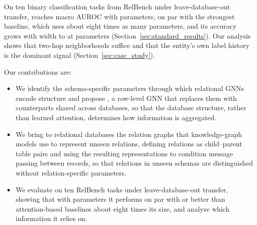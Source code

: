 On ten binary classification tasks from RelBench under leave-database-out
transfer, \model{} reaches \mainAUROC{} macro AUROC with \mainParams{}
parameters, on par with the strongest baseline, which uses about eight times as
many parameters, and its accuracy grows with width to \wideAUROC{} at
\wideParams{} parameters (Section~\ref{sec:standard_results}). Our analysis
shows that two-hop neighborhoods suffice and that the entity's own label
history is the dominant signal (Section~\ref{sec:case_study}).

Our contributions are:
\begin{itemize}
  \item We identify the schema-specific parameters through which relational
  GNNs encode structure and propose \model{}, a row-level GNN that replaces
  them with counterparts shared across databases, so that the database
  structure, rather than learned attention, determines how information is
  aggregated.
  \item We bring to relational databases the relation graphs that
  knowledge-graph models use to represent unseen relations, defining relations
  as child--parent table pairs and
  using the resulting representations to condition message passing between
  records, so that relations in unseen schemas are distinguished without
  relation-specific parameters.
  \item We evaluate \model{} on ten RelBench tasks under leave-database-out
  transfer, showing that with \mainParams{} parameters it performs on par with
  or better than attention-based baselines about eight times its size, and
  analyze which information it relies on.
\end{itemize}